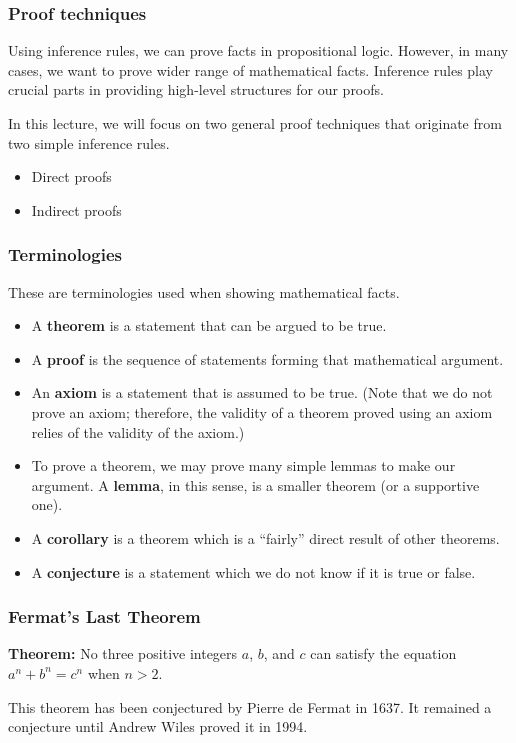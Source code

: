 

\begin{frame}\frametitle{Proof techniques}
  Using inference rules, we can prove facts in propositional logic.
  However, in many cases, we want to prove wider range of mathematical
  facts.  Inference rules play crucial parts in providing high-level
  structures for our proofs. \pause

  In this lecture, we will focus on two general proof techniques that
  originate from two simple inference rules.
  \begin{itemize}
  \item Direct proofs
  \item Indirect proofs
  \end{itemize}
\end{frame}

\begin{frame}\frametitle{Terminologies}
  These are terminologies used when showing mathematical facts.
  \begin{itemize}
  \item A {\bf theorem} is a statement that can be argued to be true.
  \item A {\bf proof} is the sequence of statements forming that
    mathematical argument.
    \pause
  \item An {\bf axiom} is a statement that is assumed to be true.
    (Note that we do not prove an axiom; therefore, the validity of a
    theorem proved using an axiom relies of the validity of the
    axiom.)
    \pause
  \item To prove a theorem, we may prove many simple lemmas to make
    our argument.  A {\bf lemma}, in this sense, is a smaller theorem
    (or a supportive one).
    \pause
  \item A {\bf corollary} is a theorem which is a ``fairly'' direct
    result of other theorems.
    \pause
  \item A {\bf conjecture} is a statement which we do not know if it
    is true or false.
  \end{itemize}
\end{frame}

\begin{frame}\frametitle{Fermat's Last Theorem}
  \begin{tcolorbox}
    {\bf Theorem:} No three positive integers $a$, $b$, and $c$ can satisfy the equation $a^n+b^n=c^n$ when $n>2$.
  \end{tcolorbox}

  This theorem has been conjectured by Pierre de Fermat in 1637.  It
  remained a conjecture until Andrew Wiles proved it in 1994.
\end{frame}


